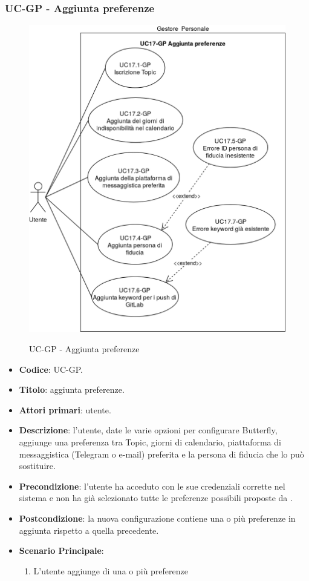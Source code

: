 \subsubsection{UC\theuccount-GP - Aggiunta preferenze}
		\begin{figure}[H]
			\centering
				\includegraphics[width=1\textwidth]{img/casi_d'uso/UC17.png}\\
			\caption{UC\theuccount-GP - Aggiunta preferenze}
		\end{figure}
	\begin{itemize}
		\item \textbf{Codice}: UC\theuccount-GP.
		\item \textbf{Titolo}: aggiunta preferenze.
		\item \textbf{Attori primari}: utente.
		\item \textbf{Descrizione}: l’utente, date le varie opzioni per configurare Butterfly, aggiunge una
		preferenza tra Topic, giorni di calendario, piattaforma di messaggistica (Telegram o e-mail)	preferita e la persona di fiducia che lo può sostituire.
		\item \textbf{Precondizione}: l’utente ha acceduto con le sue credenziali corrette nel sistema e non ha già selezionato tutte le preferenze possibili proposte da \progetto.
		\item \textbf{Postcondizione}: la nuova configurazione contiene una o più preferenze in aggiunta rispetto a quella precedente.
		\item \textbf{Scenario Principale}:
		\begin{enumerate}
			\item L'utente aggiunge di una o più preferenze
		\end{enumerate}
	\end{itemize}

